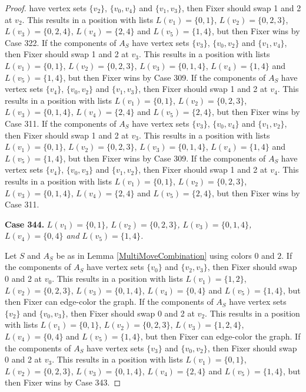 \documentclass[12pt]{amsart}
\theoremstyle{plain}
\theoremstyle{definition}
\theoremstyle{remark}
\begin{document}
\begin{proof}
have vertex sets $\{v_2\}$, $\{v_0, v_4\}$ and $\{v_1, v_3\}$, then Fixer should swap 1 and 2 at $v_2$. This results in a position with lists $L(v_1) = \{0, 1\}$, $L(v_2) = \{0, 2, 3\}$, $L(v_3) = \{0, 2, 4\}$, $L(v_4) = \{2, 4\}$ and $L(v_5) = \{1, 4\}$, but then Fixer wins by Case 322. If the components of $A_S$ have vertex sets $\{v_3\}$, $\{v_0, v_2\}$ and $\{v_1, v_4\}$, then Fixer should swap 1 and 2 at $v_3$. This results in a position with lists $L(v_1) = \{0, 1\}$, $L(v_2) = \{0, 2, 3\}$, $L(v_3) = \{0, 1, 4\}$, $L(v_4) = \{1, 4\}$ and $L(v_5) = \{1, 4\}$, but then Fixer wins by Case 309. If the components of $A_S$ have vertex sets $\{v_4\}$, $\{v_0, v_2\}$ and $\{v_1, v_3\}$, then Fixer should swap 1 and 2 at $v_4$. This results in a position with lists $L(v_1) = \{0, 1\}$, $L(v_2) = \{0, 2, 3\}$, $L(v_3) = \{0, 1, 4\}$, $L(v_4) = \{2, 4\}$ and $L(v_5) = \{2, 4\}$, but then Fixer wins by Case 311. If the components of $A_S$ have vertex sets $\{v_3\}$, $\{v_0, v_4\}$ and $\{v_1, v_2\}$, then Fixer should swap 1 and 2 at $v_3$. This results in a position with lists $L(v_1) = \{0, 1\}$, $L(v_2) = \{0, 2, 3\}$, $L(v_3) = \{0, 1, 4\}$, $L(v_4) = \{1, 4\}$ and $L(v_5) = \{1, 4\}$, but then Fixer wins by Case 309. If the components of $A_S$ have vertex sets $\{v_4\}$, $\{v_0, v_3\}$ and $\{v_1, v_2\}$, then Fixer should swap 1 and 2 at $v_4$. This results in a position with lists $L(v_1) = \{0, 1\}$, $L(v_2) = \{0, 2, 3\}$, $L(v_3) = \{0, 1, 4\}$, $L(v_4) = \{2, 4\}$ and $L(v_5) = \{2, 4\}$, but then Fixer wins by Case 311. 

\noindent\textbf{Case 344.  }\textit{$L(v_1) = \{0, 1\}$, $L(v_2) = \{0, 2, 3\}$, $L(v_3) = \{0, 1, 4\}$, $L(v_4) = \{0, 4\}$ and $L(v_5) = \{1, 4\}$.}

Let $S$ and $A_S$ be as in Lemma \ref{MultiMoveCombination} using colors $0$ and $2$. If the components of $A_S$ have vertex sets $\{v_0\}$ and $\{v_2, v_3\}$, then Fixer should swap 0 and 2 at $v_0$. This results in a position with lists $L(v_1) = \{1, 2\}$, $L(v_2) = \{0, 2, 3\}$, $L(v_3) = \{0, 1, 4\}$, $L(v_4) = \{0, 4\}$ and $L(v_5) = \{1, 4\}$, but then Fixer can edge-color the graph. If the components of $A_S$ have vertex sets $\{v_2\}$ and $\{v_0, v_3\}$, then Fixer should swap 0 and 2 at $v_2$. This results in a position with lists $L(v_1) = \{0, 1\}$, $L(v_2) = \{0, 2, 3\}$, $L(v_3) = \{1, 2, 4\}$, $L(v_4) = \{0, 4\}$ and $L(v_5) = \{1, 4\}$, but then Fixer can edge-color the graph. If the components of $A_S$ have vertex sets $\{v_3\}$ and $\{v_0, v_2\}$, then Fixer should swap 0 and 2 at $v_3$. This results in a position with lists $L(v_1) = \{0, 1\}$, $L(v_2) = \{0, 2, 3\}$, $L(v_3) = \{0, 1, 4\}$, $L(v_4) = \{2, 4\}$ and $L(v_5) = \{1, 4\}$, but then Fixer wins by Case 343. 


\end{proof}
\end{document}
